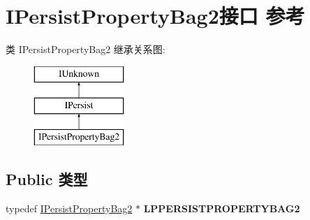 \hypertarget{interface_i_persist_property_bag2}{}\section{I\+Persist\+Property\+Bag2接口 参考}
\label{interface_i_persist_property_bag2}
类 I\+Persist\+Property\+Bag2 继承关系图\+:\begin{figure}[H]
\begin{center}
\leavevmode
\includegraphics[height=3.000000cm]{interface_i_persist_property_bag2}
\end{center}
\end{figure}
\subsection*{Public 类型}
\begin{DoxyCompactItemize}
\item 
\mbox{\label{interface_i_persist_property_bag2_a9d62bf7af3cc53a76f983f535662d160}} 
typedef \hyperlink{interface_i_persist_property_bag2}{I\+Persist\+Property\+Bag2} $\ast$ {\bfseries L\+P\+P\+E\+R\+S\+I\+S\+T\+P\+R\+O\+P\+E\+R\+T\+Y\+B\+A\+G2}
\end{DoxyCompactItemize}
